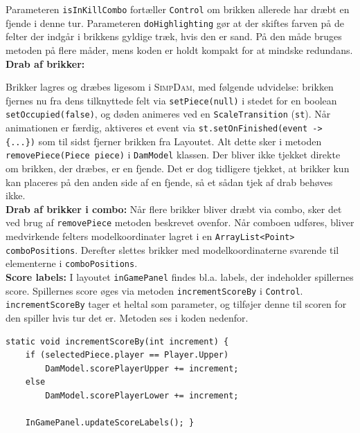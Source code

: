 Parameteren \texttt{isInKillCombo} fortæller \texttt{Control} om brikken allerede har dræbt en fjende i denne tur. Parameteren \texttt{doHighlighting} gør at der skiftes farven på de felter der indgår i brikkens gyldige træk, hvis den er sand. På den måde bruges metoden på flere måder, mens koden er holdt kompakt for at mindske redundans. \\

\textbf{Drab af brikker:} 

Brikker lagres og dræbes ligesom i \textsc{SimpDam}, med følgende udvidelse: brikken fjernes nu fra dens tilknyttede felt via \texttt{setPiece(null)} i stedet for en boolean \texttt{setOccupied(false)}, og døden animeres ved en \texttt{ScaleTransition} (\texttt{st}). Når animationen er færdig, aktiveres et event via \texttt{st.setOnFinished(event -> \{...\})} som til sidst fjerner brikken fra Layoutet. Alt dette sker i metoden \texttt{removePiece(Piece piece)} i \texttt{DamModel} klassen. Der bliver ikke tjekket direkte om brikken, der dræbes, er en fjende. Det er dog tidligere tjekket, at brikker kun kan placeres på den anden side af en fjende, så et sådan tjek af drab behøves ikke.\\

\textbf{Drab af brikker i combo:} 
Når flere brikker bliver dræbt via combo, sker det ved brug af \texttt{removePiece} metoden beskrevet ovenfor. Når comboen udføres, bliver medvirkende felters modelkoordinater lagret i en \texttt{ArrayList<Point> comboPositions}. Derefter slettes brikker med modelkoordinaterne svarende til elementerne i \texttt{comboPositions}.\\

\textbf{Score labels:} I layoutet \texttt{inGamePanel} findes bl.a. labels, der indeholder spillernes score. Spillernes score øges via metoden \texttt{incrementScoreBy} i \texttt{Control}. \texttt{incrementScoreBy} tager et heltal som parameter, og tilføjer denne til scoren for den spiller hvis tur det er. Metoden ses i koden nedenfor.
\begin{lstlisting}
static void incrementScoreBy(int increment) {
	if (selectedPiece.player == Player.Upper)
		DamModel.scorePlayerUpper += increment;
	else
		DamModel.scorePlayerLower += increment;

	InGamePanel.updateScoreLabels(); }
\end{lstlisting}

